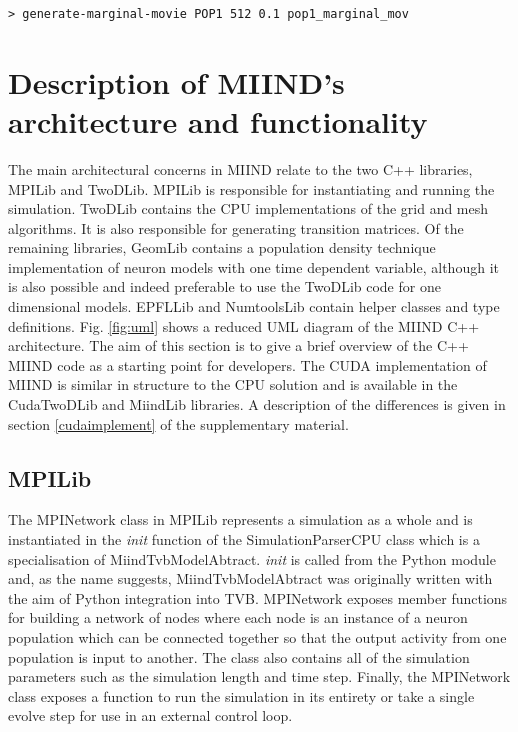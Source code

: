 \documentclass[utf8]{frontiersSCNS} %
\begin{document}
\begin{lstlisting}[language=xml,caption={Generate a marginals movie from the density files of population POP1 with a size of 512 pixels at a simulation replay time step of 0.1s.}]
> generate-marginal-movie POP1 512 0.1 pop1_marginal_mov
\end{lstlisting}

\section{Description of MIIND's architecture and functionality}
The main architectural concerns in MIIND relate to the two C++ libraries, MPILib and TwoDLib. MPILib is responsible for instantiating and running the simulation. TwoDLib contains the CPU implementations of the grid and mesh algorithms. It is also responsible for generating transition matrices. Of the remaining libraries, GeomLib contains a population density technique implementation of neuron models with one time dependent variable, although it is also possible and indeed preferable to use the TwoDLib code for one dimensional models. EPFLLib and NumtoolsLib contain helper classes and type definitions. Fig. \ref{fig:uml} shows a reduced UML diagram of the MIIND C++ architecture. The aim of this section is to give a brief overview of the C++ MIIND code as a starting point for developers. The CUDA implementation of MIIND is similar in structure to the CPU solution and is available in the CudaTwoDLib and MiindLib libraries. A description of the differences is given in section \ref{cudaimplement} of the supplementary material.

\subsection{MPILib}

The MPINetwork class in MPILib represents a simulation as a whole and is instantiated in the \textit{init} function of the SimulationParserCPU class which is a specialisation of MiindTvbModelAbtract. \textit{init} is called from the Python module and, as the name suggests, MiindTvbModelAbtract was originally written with the aim of Python integration into TVB. MPINetwork exposes member functions for building a network of nodes where each node is an instance of a neuron population which can be connected together so that the output activity from one population is input to another. The class also contains all of the simulation parameters such as the simulation length and time step. Finally, the MPINetwork class exposes a function to run the simulation in its entirety or take a single evolve step for use in an external control loop.
\end{document}
